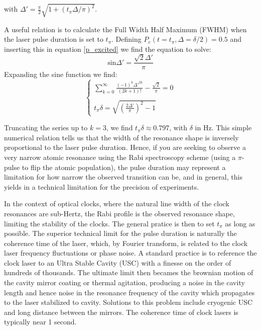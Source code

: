 with $\Delta' = \frac{\pi}{2} \sqrt{1 + (t_{\pi} \Delta / \pi)^{2}}  $.

A useful relation is to calculate the Full Width Half Maximum (FWHM) when the laser pulse duration is set to $t_{\pi}$. Defining $P_{e}(t=t_{\pi}, \Delta=\delta/2) = 0.5$ and inserting this in equation \ref{p_excited} we find the equation to solve:
\begin{equation}
    \textrm{sin}\Delta' = \frac{\sqrt{2}\Delta'}{\pi}
\end{equation}
Expanding the sine function we find:
\begin{equation}
    \begin{cases}
    \sum_{k=0}^{\infty} \frac{(-1)^{k}\Delta'^{2k}}{(2k+1)!} - \frac{\sqrt{2}}{\pi} = 0 \\
    \\
    t_{\pi}\delta = \sqrt{ (\frac{2\Delta'}{\pi})^{2} - 1}
    \end{cases}
\end{equation}

Truncating the series up to $k=3$, we find $t_{\pi}\delta \approx 0.797$, with $\delta$ in Hz. This simple numerical relation tells us that the width of the resonance shape is inversely proportional to the laser pulse duration. Hence, if you are seeking to observe a very narrow atomic resonance using the Rabi spectroscopy scheme (using a $\pi$-pulse to flip the atomic population), the pulse duration may represent a limitation for how narrow the observed transition can be, and in general, this yields in a technical limitation for the precision of experiments.

In the context of optical clocks, where the natural line width of the clock resonances are sub-Hertz, the Rabi profile is the observed resonance shape, limiting the stability of the clocks. The general pratice is then to set $t_{\pi}$ as long as possible. The superior technical limit for the pulse duration is naturally the coherence time of the laser, which, by Fourier transform, is related to the clock laser frequency fluctuations or phase noise. A standard practice is to reference the clock laser to an Ultra Stable Cavity (USC) with a finesse on the order of hundreds of thousands.
The ultimate limit then becames the brownian motion of the cavity mirror coating or thermal agitation, producing a noise in the cavity length and hence noise in the resonance frequency of the cavity which propagates to the laser stabilized to cavity. Solutions to this problem include cryogenic USC and long distance between the mirrors. The coherence time of clock lasers is typically near 1 second.
